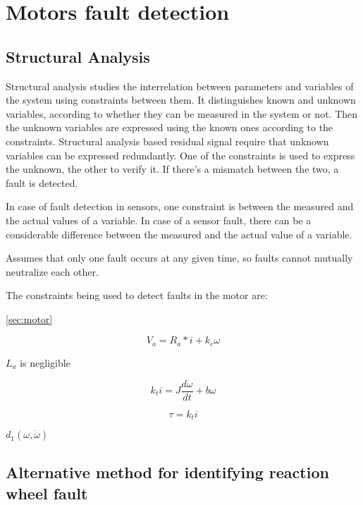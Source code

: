 \section{Motors fault detection}

\label{sec:structural}
\subsection{Structural Analysis}
Structural analysis studies the interrelation between parameters and variables of the system using constraints between them. It distinguishes known and unknown variables, according to whether they can be measured in the system or not. Then the unknown variables are expressed using the known ones according to the constraints. Structural analysis based residual signal require that unknown variables can be expressed redundantly. One of the constraints is used to express the unknown, the other to verify it. If there's a mismatch between the two, a fault is detected.

In case of fault detection in sensors, one constraint is between the measured and the actual values of a variable. In case of a sensor fault, there can be a considerable difference between the measured and the actual value of a variable.

Assumes that only one fault occurs at any given time, so faults cannot mutually neutralize each other. 

The constraints being used to detect faults in the motor are:

\ref{sec:motor} 


\begin{equation}
V_a = R_a * i + k_e \omega
\end{equation}

$L_a$ is negligible

\begin{equation}
 k_{t}i  =J\dfrac{d\omega}{dt} + b\omega
\end{equation}

\begin{equation}
\tau = k_t i
\end{equation}

$d_1(\omega, \dot{\omega})$


\subsection{Alternative method for identifying reaction wheel fault}

